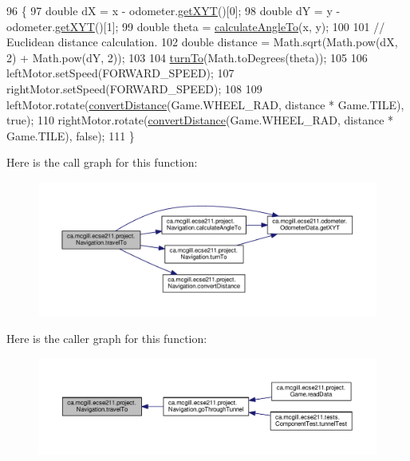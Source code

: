 \begin{DoxyCode}
96                                            \{
97     \textcolor{keywordtype}{double} dX = x - odometer.\hyperlink{classca_1_1mcgill_1_1ecse211_1_1odometer_1_1_odometer_data_a8f40f0264c68f0cbed4fff1723ae7863}{getXYT}()[0];
98     \textcolor{keywordtype}{double} dY = y - odometer.\hyperlink{classca_1_1mcgill_1_1ecse211_1_1odometer_1_1_odometer_data_a8f40f0264c68f0cbed4fff1723ae7863}{getXYT}()[1];
99     \textcolor{keywordtype}{double} theta = \hyperlink{classca_1_1mcgill_1_1ecse211_1_1project_1_1_navigation_a4376e54162df8f123ca3b52e4fd2f38d}{calculateAngleTo}(x, y);
100 
101     \textcolor{comment}{// Euclidean distance calculation.}
102     \textcolor{keywordtype}{double} distance = Math.sqrt(Math.pow(dX, 2) + Math.pow(dY, 2));
103 
104     \hyperlink{classca_1_1mcgill_1_1ecse211_1_1project_1_1_navigation_a3bbe0645f2b3b3d0986b4a707fb5a00c}{turnTo}(Math.toDegrees(theta));
105 
106     leftMotor.setSpeed(FORWARD\_SPEED);
107     rightMotor.setSpeed(FORWARD\_SPEED);
108 
109     leftMotor.rotate(\hyperlink{classca_1_1mcgill_1_1ecse211_1_1project_1_1_navigation_ac9e260bcd619ffa4820d7d0de7ea1c12}{convertDistance}(Game.WHEEL\_RAD, distance * Game.TILE), \textcolor{keyword}{true});
110     rightMotor.rotate(\hyperlink{classca_1_1mcgill_1_1ecse211_1_1project_1_1_navigation_ac9e260bcd619ffa4820d7d0de7ea1c12}{convertDistance}(Game.WHEEL\_RAD, distance * Game.TILE), \textcolor{keyword}{false});
111   \}
\end{DoxyCode}
Here is the call graph for this function\+:
\nopagebreak
\begin{figure}[H]
\begin{center}
\leavevmode
\includegraphics[width=350pt]{classca_1_1mcgill_1_1ecse211_1_1project_1_1_navigation_ad89b3dd084d81b4ec4d89ea73ba13eaa_cgraph}
\end{center}
\end{figure}
Here is the caller graph for this function\+:
\nopagebreak
\begin{figure}[H]
\begin{center}
\leavevmode
\includegraphics[width=350pt]{classca_1_1mcgill_1_1ecse211_1_1project_1_1_navigation_ad89b3dd084d81b4ec4d89ea73ba13eaa_icgraph}
\end{center}
\end{figure}
